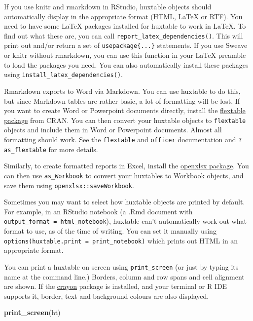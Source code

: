 \documentclass[]{article}
\newenvironment{Shaded}{\begin{snugshade}}{\end{snugshade}}
\newcommand{\KeywordTok}[1]{\textcolor[rgb]{0.13,0.29,0.53}{\textbf{#1}}}
\newcommand{\NormalTok}[1]{#1}
\begin{document}
If you use knitr and rmarkdown in RStudio, huxtable objects should
automatically display in the appropriate format (HTML, LaTeX or RTF).
You need to have some LaTeX packages installed for huxtable to work in
LaTeX. To find out what these are, you can call
\texttt{report\_latex\_dependencies()}. This will print out and/or
return a set of \texttt{usepackage\{...\}} statements. If you use Sweave
or knitr without rmarkdown, you can use this function in your LaTeX
preamble to load the packages you need. You can also automatically
install these packages using \texttt{install\_latex\_dependencies()}.

Rmarkdown exports to Word via Markdown. You can use huxtable to do this,
but since Markdown tables are rather basic, a lot of formatting will be
lost. If you want to create Word or Powerpoint documents directly,
install the
\href{https://cran.r-project.org/package=flextable}{flextable package}
from CRAN. You can then convert your huxtable objects to
\texttt{flextable} objects and include them in Word or Powerpoint
documents. Almost all formatting should work. See the \texttt{flextable}
and \texttt{officer} documentation and \texttt{?as\_flextable} for more
details.

Similarly, to create formatted reports in Excel, install the
\href{https://cran.r-project.org/package=openxlsx}{openxlsx package}.
You can then use \texttt{as\_Workbook} to convert your huxtables to
Workbook objects, and save them using \texttt{openxlsx::saveWorkbook}.

Sometimes you may want to select how huxtable objects are printed by
default. For example, in an RStudio notebook (a .Rmd document with
\texttt{output\_format\ =\ html\_notebook}), huxtable can't
automatically work out what format to use, as of the time of writing.
You can set it manually using
\texttt{options(huxtable.print\ =\ print\_notebook)} which prints out
HTML in an appropriate format.

You can print a huxtable on screen using \texttt{print\_screen} (or just
by typing its name at the command line.) Borders, column and row spans
and cell alignment are shown. If the
\href{https://cran.r-project.org/package=crayon}{crayon} package is
installed, and your terminal or R IDE supports it, border, text and
background colours are also displayed.

\begin{Shaded}
\begin{Highlighting}[]
\KeywordTok{print_screen}\NormalTok{(ht)}
\end{Highlighting}
\end{Shaded}
\end{document}
